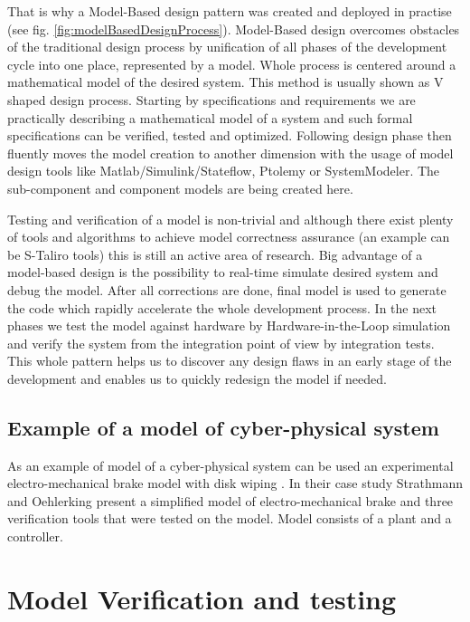 \documentclass[english,technical,10pt]{FITreport}[2018/01/26]
\begin{document}
That is why a Model-Based design pattern was created and deployed in practise (see fig. \ref{fig:modelBasedDesignProcess}). Model-Based design overcomes obstacles of the traditional design process by unification of all phases of the development cycle into one place, represented by a model. Whole process is centered around a mathematical model of the desired system. This method is usually shown as V shaped design process. Starting by specifications and requirements we are practically describing a mathematical model of a system and such formal specifications can be verified, tested and optimized. Following design phase then fluently moves the model creation to another dimension with the usage of model design tools like Matlab/Simulink/Stateflow, Ptolemy or SystemModeler. The sub-component and component models are being created here.

Testing and verification of a model is non-trivial and although there exist plenty of tools and algorithms to achieve model correctness assurance (an example can be S-Taliro tools) this is still an active area of research. Big advantage of a model-based design is the possibility to real-time simulate desired system and debug the model. After all corrections are done, final model is used to generate the code which rapidly accelerate the whole development process. In the next phases we test the model against hardware by Hardware-in-the-Loop simulation and verify the system from the integration point of view by integration tests. This whole pattern helps us to discover any design flaws in an early stage of the development and enables us to quickly redesign the model if needed.

\subsection{Example of a model of cyber-physical system}

As an example of model of a cyber-physical system can be used an experimental electro-mechanical brake model with disk wiping \cite{Oehlerking:2015}. In their case study Strathmann and Oehlerking present a simplified model of electro-mechanical brake and three verification tools that were tested on the model. Model consists of a plant and a controller.

\section{Model Verification and testing}
\end{document}
